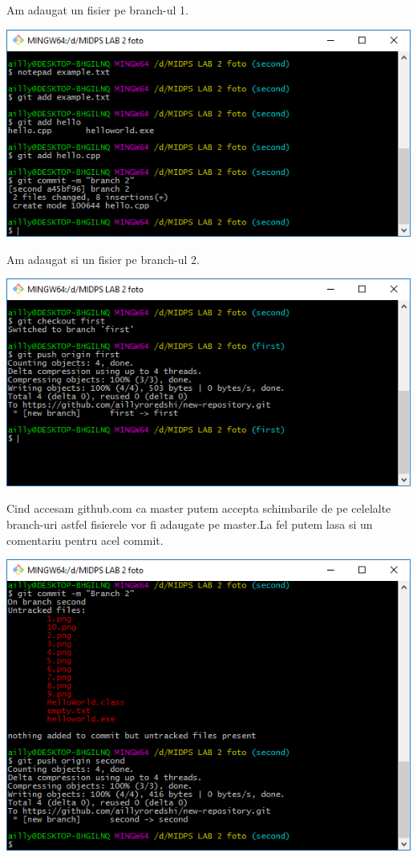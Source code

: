 Am adaugat un fisier pe branch-ul 1.\\
\begin{center}
\includegraphics[scale=0.75]{images/9}\\
\end{center}

Am adaugat si un fisier pe branch-ul 2.\\
\begin{center}
\includegraphics[scale=0.75]{images/10}\\
\end{center}

Cind accesam github.com ca master putem accepta schimbarile de pe celelalte branch-uri astfel fisierele vor fi adaugate pe master.La fel putem lasa si un comentariu pentru acel commit.\\
\begin{center}
\includegraphics[scale=0.75]{images/11}\\
\end{center}

